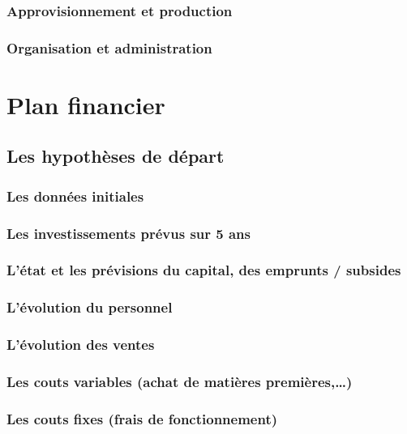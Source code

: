 \documentclass[a4paper]{report}
\begin{document}
\subsection{Approvisionnement et production}

\subsection{Organisation et administration}




\chapter{Plan financier}

\section{Les hypothèses de départ}

\subsection{Les données initiales}

\subsection{Les investissements prévus sur 5 ans}

\subsection{L’état et les prévisions du capital, des emprunts / subsides}

\subsection{L’évolution du personnel}

\subsection{L’évolution des ventes}

\subsection{Les couts variables (achat de matières premières,\ldots)}

\subsection{Les couts fixes (frais de fonctionnement)}
\end{document}
